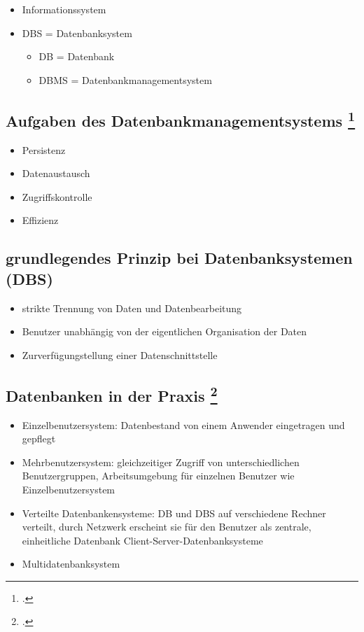 \documentclass{bschlangaul-haupt}
\begin{document}
\begin{itemize}
\item Informationssystem
\item DBS = Datenbanksystem

\begin{itemize}
\item DB = Datenbank
\item DBMS = Datenbankmanagementsystem
\end{itemize}
\end{itemize}

%

\subsection{Aufgaben des Datenbankmanagementsystems
\footcite[Seite 13]{winter}}

\begin{itemize}
\item Persistenz
\item Datenaustausch
\item Zugriffskontrolle
\item Effizienz
\end{itemize}

%

\subsection{grundlegendes Prinzip bei Datenbanksystemen
(DBS)}

\begin{itemize}
\item strikte Trennung von Daten und Datenbearbeitung
\item Benutzer unabhängig von der eigentlichen Organisation der Daten
\item Zurverfügungstellung einer Datenschnittstelle
\end{itemize}

%

\subsection{Datenbanken in der Praxis
\footcite[Seite 13]{winter}}

\begin{itemize}
\item Einzelbenutzersystem: Datenbestand von einem Anwender eingetragen und
gepflegt

\item Mehrbenutzersystem: gleichzeitiger Zugriff von unterschiedlichen
Benutzergruppen, Arbeitsumgebung für einzelnen Benutzer wie
Einzelbenutzersystem

\item Verteilte Datenbankensysteme: DB und DBS auf verschiedene Rechner
verteilt, durch Netzwerk erscheint sie für den Benutzer als zentrale,
einheitliche Datenbank \zB Client-Server-Datenbanksysteme

\item Multidatenbanksystem
\end{itemize}

\literatur
\end{document}
